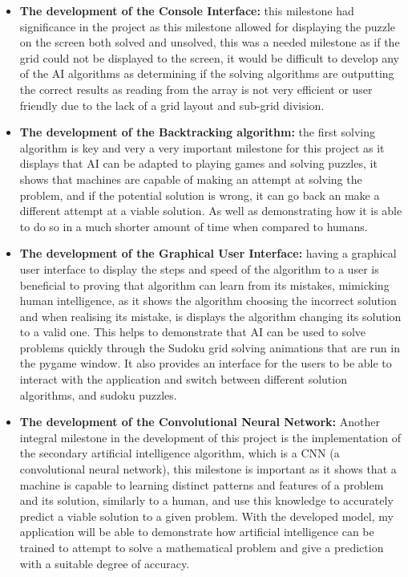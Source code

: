 \documentclass[]{final_report}
\begin{document}
\begin{itemize} 
    \item \textbf{The development of the Console Interface:} this milestone had significance in the project as this milestone allowed for displaying the puzzle on the screen both solved and unsolved, this was a needed milestone as if the grid could not be displayed to the screen, it would be difficult to develop any of the AI algorithms as determining if the solving algorithms are outputting the correct results as reading from the array is not very efficient or user friendly due to the lack of a grid layout and sub-grid division. 

    \item \textbf{The development of the Backtracking algorithm:} the first solving algorithm is key and very a very important milestone for this project as it displays that AI can be adapted to playing games and solving puzzles, it shows that machines are capable of making an attempt at solving the problem, and if the potential solution is wrong, it can go back an make a different attempt at a viable solution. As well as demonstrating how it is able to do so in a much shorter amount of time when compared to humans.  

    \item \textbf{The development of the Graphical User Interface:} having a graphical user interface to display the steps and speed of the algorithm to a user is beneficial to proving that algorithm can learn from its mistakes, mimicking human intelligence, as it shows the algorithm choosing the incorrect solution and when realising its mistake, is displays the algorithm changing its solution to a valid one. This helps to demonstrate that AI can be used to solve problems quickly through the Sudoku grid solving animations that are run in the pygame window. It also provides an interface for the users to be able to interact with the application and switch between different solution algorithms, and sudoku puzzles.

    \item \textbf{The development of the Convolutional Neural Network:}
    Another integral milestone in the development of this project is the implementation of the secondary artificial intelligence algorithm, which is a CNN (a convolutional neural network), this milestone is important as it shows that a machine is capable to learning distinct patterns and features of a problem and its solution, similarly to a human, and use this knowledge to accurately predict a viable solution to a given problem. With the developed model, my application will be able to demonstrate how artificial intelligence can be trained to attempt to solve a mathematical problem and give a prediction with a suitable degree of accuracy.
\end{itemize}
\end{document}
